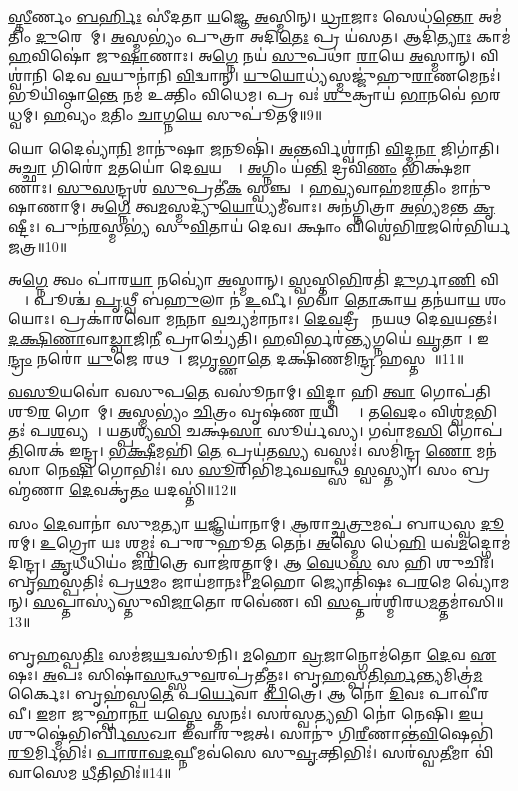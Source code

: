 \ul{𑌸𑍍𑌤𑍀}𑌰𑍍𑌣𑌂 \ul{𑌬}\ul{𑌰𑍍}𑌹𑌿𑌃 𑌸𑍀॑𑌦𑌤𑌾 \ul{𑌯}𑌜𑍍𑌞𑍇 \ul{𑌅}𑌸𑍍𑌮𑌿𑌨𑍍।
\ul{𑌧𑍍𑌰𑌾}𑌜𑌾𑌃 𑌸𑍇𑌧॑\ul{𑌨𑍍𑌤𑍋} 𑌅𑌮॑𑌤𑌿𑌂 \ul{𑌦𑍁}𑌰𑍇𑌵𑌾᳚𑌮𑍍।
\ul{𑌅}𑌸𑍍𑌮𑌭𑍍𑌯𑌂॑ 𑌪𑍁𑌤𑍍𑌰𑌾 𑌅𑌦𑌿\ul{𑌤𑍇𑌃} 𑌪𑍍𑌰 𑌯॑𑌸𑌤।
𑌆𑌦𑌿॑\ul{𑌤𑍍𑌯𑌾𑌃} 𑌕𑌾𑌮॑ \ul{𑌹}𑌵𑌿𑌷𑍋॑ 𑌜𑍁\ul{𑌷𑌾}𑌣𑌾𑌃।
𑌅\ul{𑌗𑍍𑌨𑍇} 𑌨𑌯॑ \ul{𑌸𑍁}𑌪𑌥𑌾॑ \ul{𑌰𑌾}𑌯𑍇 \ul{𑌅}𑌸𑍍𑌮𑌾𑌨𑍍।
𑌵𑌿𑌶𑍍𑌵𑌾॑𑌨𑌿 𑌦𑍇𑌵 \ul{𑌵}𑌯𑍁𑌨𑌾॑𑌨𑌿 \ul{𑌵𑌿}𑌦𑍍𑌵𑌾𑌨𑍍।
\ul{𑌯𑍁}\ul{𑌯𑍋}𑌧𑍍𑌯॑𑌸𑍍𑌮𑌜𑍍𑌜𑍁॑𑌹𑍁\ul{𑌰𑌾}𑌣𑌮𑍇𑌨𑌃॑।
𑌭𑍂𑌯𑌿॑𑌷𑍍𑌠𑌾\ul{𑌨𑍍𑌤𑍇} 𑌨𑌮॑ 𑌉𑌕𑍍𑌤𑌿𑌂 𑌵𑌿𑌧𑍇𑌮।
𑌪𑍍𑌰 𑌵𑌃॑ \ul{𑌶𑍁}𑌕𑍍𑌰𑌾𑌯॑ \ul{𑌭𑌾}𑌨𑌵𑍇॑ 𑌭𑌰𑌧𑍍𑌵𑌮𑍍।
\ul{𑌹}𑌵𑍍𑌯𑌂 \ul{𑌮}𑌤𑌿𑌂 \ul{𑌚𑌾}𑌗𑍍𑌨\ul{𑌯𑍇} 𑌸𑍁𑌪𑍂॑𑌤𑌮𑍍॥9॥

𑌯𑍋 𑌦𑍈𑌵𑍍𑌯𑌾॑\ul{𑌨𑌿} 𑌮𑌾𑌨𑍁॑𑌷𑌾 \ul{𑌜}𑌨𑍂𑌷𑌿॑।
\ul{𑌅}𑌨𑍍𑌤𑌰𑍍𑌵𑌿𑌶𑍍𑌵𑌾॑𑌨𑌿 \ul{𑌵𑌿}𑌦𑍍𑌮\ul{𑌨𑌾} 𑌜𑌿𑌗𑌾॑𑌤𑌿।
𑌅\ul{𑌚𑍍𑌛𑌾} 𑌗𑌿𑌰𑍋॑ \ul{𑌮}𑌤𑌯𑍋॑ 𑌦𑍇\ul{𑌵}𑌯𑌨𑍍𑌤𑍀𑌃᳚।
\ul{𑌅}𑌗𑍍𑌨𑌿𑌂 𑌯॑\ul{𑌨𑍍𑌤𑌿} 𑌦𑍍𑌰𑌵𑌿॑\ul{𑌣𑌂} 𑌭𑌿𑌕𑍍𑌷॑𑌮𑌾𑌣𑌾𑌃।
\ul{𑌸𑍁}\ul{𑌸}𑌨𑍍𑌦𑍃𑌶॑ \ul{𑌸𑍁}𑌪𑍍𑌰𑌤𑍀॑\ul{𑌕}\ul{} 𑌸𑍍𑌵𑌞𑍍𑌚𑌮𑍍᳚।
\ul{𑌹}\ul{𑌵𑍍𑌯}𑌵𑌾𑌹॑𑌮\ul{𑌰}𑌤𑌿𑌂 𑌮𑌾𑌨𑍁॑𑌷𑌾𑌣𑌾𑌮𑍍।
𑌅\ul{𑌗𑍍𑌨𑍇} 𑌤𑍍𑌵\ul{𑌮}𑌸𑍍𑌮𑌦𑍍𑌯𑍁॑\ul{𑌯𑍋}𑌧𑍍𑌯𑌮𑍀॑𑌵𑌾𑌃।
𑌅𑌨॑𑌗𑍍𑌨𑌿𑌤𑍍𑌰𑌾 \ul{𑌅}𑌭𑍍𑌯॑𑌮𑌨𑍍𑌤 \ul{𑌕𑍃}𑌷𑍍𑌟𑍀𑌃।
𑌪𑍁𑌨॑\ul{𑌰}𑌸𑍍𑌮𑌭𑍍𑌯॑ 𑌸𑍁\ul{𑌵𑌿}𑌤𑌾𑌯॑ 𑌦𑍇𑌵।
𑌕𑍍𑌷𑌾𑌂 𑌵𑌿𑌶𑍍𑌵𑍇॑𑌭𑌿\ul{𑌰}𑌜𑌰𑍇॑𑌭𑌿𑌰𑍍𑌯𑌜𑌤𑍍𑌰॥10॥

𑌅\ul{𑌗𑍍𑌨𑍇} 𑌤𑍍𑌵𑌂 𑌪𑌾॑𑌰\ul{𑌯𑌾} 𑌨𑌵𑍍𑌯𑍋॑ \ul{𑌅}𑌸𑍍𑌮𑌾𑌨𑍍।
\ul{𑌸𑍍𑌵}𑌸𑍍𑌤𑌿\ul{𑌭𑌿}𑌰𑌤𑌿॑ \ul{𑌦𑍁}𑌰𑍍𑌗𑌾\ul{𑌣𑌿} 𑌵𑌿𑌶𑍍𑌵𑌾᳚।
𑌪𑍂𑌶𑍍𑌚॑ \ul{𑌪𑍃}𑌥𑍍𑌵𑍀 𑌬॑\ul{𑌹𑍁}𑌲𑌾 𑌨॑ \ul{𑌉}𑌰𑍍𑌵𑍀।
𑌭𑌵𑌾॑ \ul{𑌤𑍋}𑌕𑌾\ul{𑌯} 𑌤𑌨॑𑌯𑌾\ul{𑌯} 𑌶𑌂 𑌯𑍋𑌃।
𑌪𑍍𑌰𑌕𑌾॑𑌰𑌵𑍋 𑌮\ul{𑌨}𑌨𑌾 \ul{𑌵}𑌚𑍍𑌯𑌮𑌾॑𑌨𑌾𑌃।
\ul{𑌦𑍇}\ul{𑌵}𑌦𑍍𑌰𑍀𑌚𑍀𑌂᳚ 𑌨𑌯𑌥 𑌦𑍇\ul{𑌵}𑌯𑌨𑍍𑌤𑌃॑।
\ul{𑌦}\ul{𑌕𑍍𑌷𑌿}\ul{𑌣𑌾}𑌵𑌾\ul{𑌡𑍍𑌵𑌾}𑌜𑌿\ul{𑌨𑍀} 𑌪𑍍𑌰𑌾𑌚𑍍𑌯𑍇॑𑌤𑌿।
\ul{𑌹}𑌵𑌿𑌰𑍍𑌭𑌰॑\ul{𑌨𑍍𑌤𑍍𑌯}𑌗𑍍𑌨𑌯𑍇॑ \ul{𑌘𑍃}𑌤𑌾𑌚𑍀᳚।
𑌇\ul{𑌨𑍍𑌦𑍍𑌰𑌂} 𑌨𑌰𑍋॑ \ul{𑌯𑍁}𑌜𑍇 𑌰𑌥𑌮𑍍᳚।
\ul{𑌜}\ul{𑌗𑍃}𑌭𑍍𑌣𑌾\ul{𑌤𑍇} 𑌦𑌕𑍍𑌷𑌿॑𑌣𑌮𑌿\ul{𑌨𑍍𑌦𑍍𑌰} 𑌹𑌸𑍍𑌤𑌮𑍍᳚॥11॥

\ul{𑌵}\ul{𑌸𑍂}𑌯𑌵𑍋॑ 𑌵𑌸𑍁𑌪\ul{𑌤𑍇} 𑌵𑌸𑍂॑𑌨𑌾𑌮𑍍।
\ul{𑌵𑌿}𑌦𑍍𑌮𑌾 𑌹𑌿 \ul{𑌤𑍍𑌵𑌾} 𑌗𑍋𑌪॑𑌤𑌿 𑌶𑍂\ul{𑌰} 𑌗𑍋𑌨𑌾᳚𑌮𑍍।
\ul{𑌅}𑌸𑍍𑌮𑌭𑍍𑌯𑌂॑ \ul{𑌚𑌿}𑌤𑍍𑌰𑌂 𑌵𑍃𑌷॑𑌣 \ul{𑌰}𑌯𑌿𑌨𑍍𑌦𑌾𑌃᳚।
𑌤\ul{𑌵𑍇}𑌦𑌂 𑌵𑌿𑌶𑍍𑌵॑\ul{𑌮}𑌭𑌿𑌤𑌃॑ 𑌪\ul{𑌶}𑌵𑍍𑌯𑌮𑍍᳚।
𑌯𑌤𑍍𑌪𑌶𑍍𑌯॑\ul{𑌸𑌿} 𑌚𑌕𑍍𑌷॑\ul{𑌸𑌾} 𑌸𑍂𑌰𑍍𑌯॑𑌸𑍍𑌯।
𑌗𑌵𑌾॑𑌮\ul{𑌸𑌿} 𑌗𑍋𑌪॑\ul{𑌤𑌿}𑌰𑍇𑌕॑ 𑌇𑌨𑍍𑌦𑍍𑌰।
\ul{𑌭}\ul{𑌕𑍍𑌷𑍀}𑌮𑌹𑌿॑ \ul{𑌤𑍇} 𑌪𑍍𑌰𑌯॑𑌤\ul{𑌸𑍍𑌯} 𑌵𑌸𑍍𑌵𑌃॑।
𑌸𑌮𑌿॑𑌨𑍍𑌦𑍍𑌰 \ul{𑌣𑍋} 𑌮𑌨॑𑌸𑌾 𑌨𑍇\ul{𑌷𑌿} 𑌗𑍋𑌭𑌿𑌃॑।
𑌸 \ul{𑌸𑍂}𑌰𑌿𑌭𑌿॑𑌰𑍍𑌮𑌘\ul{𑌵}𑌨𑍍𑌥𑍍𑌸 \ul{𑌸𑍍𑌵}𑌸𑍍𑌤𑍍𑌯𑌾।
𑌸𑌂 𑌬𑍍𑌰𑌹𑍍𑌮॑𑌣𑌾 \ul{𑌦𑍇}𑌵𑌕𑍃॑\ul{𑌤𑌂} 𑌯𑌦𑌸𑍍𑌤𑌿॑॥12॥

𑌸𑌂 \ul{𑌦𑍇}𑌵𑌾𑌨𑌾॑ 𑌸𑍁\ul{𑌮}𑌤𑍍𑌯𑌾 \ul{𑌯}𑌜𑍍𑌞𑌿𑌯𑌾॑𑌨𑌾𑌮𑍍।
\ul{𑌆}𑌰𑌾𑌚𑍍𑌛\ul{𑌤𑍍𑌰𑍁}𑌮𑌪॑ 𑌬𑌾𑌧𑌸𑍍𑌵 \ul{𑌦𑍂}𑌰𑌮𑍍।
\ul{𑌉}𑌗𑍍𑌰𑍋 𑌯𑌃 𑌶𑌮𑍍𑌬𑌃॑ 𑌪𑍁𑌰𑍁𑌹𑍂\ul{𑌤} 𑌤𑍇𑌨॑।
\ul{𑌅}𑌸𑍍𑌮𑍇 𑌧𑍇॑\ul{𑌹𑌿} 𑌯𑌵॑\ul{𑌮}𑌦𑍍𑌗𑍋𑌮॑𑌦𑌿𑌨𑍍𑌦𑍍𑌰।
\ul{𑌕𑍃}𑌧𑍀𑌧𑌿𑌯𑌂॑ 𑌜\ul{𑌰𑌿}𑌤𑍍𑌰𑍇 𑌵𑌾𑌜॑𑌰𑌤𑍍𑌨𑌾𑌮𑍍।
𑌆 \ul{𑌵𑍇}𑌧\ul{𑌸}\ul{} 𑌸 𑌹𑌿 𑌶𑍁𑌚𑌿𑌃॑।
𑌬𑍃\ul{𑌹}𑌸𑍍𑌪𑌤𑌿𑌃॑ 𑌪𑍍𑌰\ul{𑌥}𑌮𑌂 𑌜𑌾𑌯॑𑌮𑌾𑌨𑌃।
\ul{𑌮}𑌹𑍋 𑌜𑍍𑌯𑍋𑌤𑌿॑𑌷𑌃 𑌪\ul{𑌰}𑌮𑍇 𑌵𑍍𑌯𑍋॑𑌮𑌨𑍍।
\ul{𑌸}𑌪𑍍𑌤𑌾𑌸𑍍𑌯॑𑌸𑍍𑌤𑍁𑌵𑌿\ul{𑌜𑌾}𑌤𑍋 𑌰𑌵𑍇॑𑌣।
𑌵𑌿 \ul{𑌸}𑌪𑍍𑌤𑌰॑𑌶𑍍𑌮𑌿𑌰𑌧\ul{𑌮}𑌤𑍍𑌤𑌮𑌾॑𑌸𑌿॥13॥

𑌬𑍃\ul{𑌹}𑌸𑍍𑌪\ul{𑌤𑌿𑌃} 𑌸𑌮॑𑌜\ul{𑌯}𑌦𑍍𑌵𑌸𑍂॑𑌨𑌿।
\ul{𑌮}𑌹𑍋 \ul{𑌵𑍍𑌰}𑌜𑌾𑌨𑍍𑌗𑍋𑌮॑𑌤𑍋 \ul{𑌦𑍇}𑌵 \ul{𑌏}𑌷𑌃।
\ul{𑌅}𑌪𑌃 𑌸𑌿𑌷𑌾॑\ul{𑌸}𑌨𑍍𑌥𑍍𑌸𑍁\ul{𑌵}𑌰𑌪𑍍𑌰॑𑌤𑍀𑌤𑍍𑌤𑌃।
𑌬𑍃\ul{𑌹}𑌸𑍍𑌪\ul{𑌤𑌿}\ul{𑌰𑍍}𑌹\ul{𑌨𑍍𑌤𑍍𑌯}𑌮𑌿𑌤𑍍𑌰॑\ul{𑌮}𑌰𑍍𑌕𑍈𑌃।
𑌬𑍃𑌹॑𑌸𑍍𑌪\ul{𑌤𑍇} 𑌪\ul{𑌰𑍍𑌯𑍇}𑌵𑌾 \ul{𑌪𑌿}𑌤𑍍𑌰𑍇।
𑌆 𑌨𑍋॑ \ul{𑌦𑌿}𑌵𑌃 𑌪𑌾𑌵𑍀॑𑌰𑌵𑍀।
\ul{𑌇}𑌮𑌾 𑌜𑍁𑌹𑍍𑌵𑌾॑\ul{𑌨𑌾} 𑌯\ul{𑌸𑍍𑌤𑍇} 𑌸𑍍𑌤𑌨𑌃॑।
𑌸𑌰॑𑌸𑍍𑌵\ul{𑌤𑍍𑌯}𑌭𑌿 𑌨𑍋॑ 𑌨𑍇𑌷𑌿।
\ul{𑌇}𑌯 𑌶𑍁𑌷𑍍𑌮𑍇॑𑌭𑌿𑌰𑍍𑌬𑌿\ul{𑌸}𑌖𑌾 𑌇॑𑌵𑌾𑌰𑍁𑌜𑌤𑍍।
𑌸𑌾𑌨𑍁॑ 𑌗𑌿\ul{𑌰𑍀}𑌣𑌾𑌨𑍍𑌤॑\ul{𑌵𑌿}𑌷𑍇𑌭𑌿॑\ul{𑌰𑍂}𑌰𑍍𑌮𑌿𑌭𑌿𑌃॑।
\ul{𑌪𑌾}\ul{𑌰𑌾}\ul{𑌵}\ul{𑌦}𑌘𑍍𑌨𑍀𑌮𑌵॑𑌸𑍇 𑌸𑍁\ul{𑌵𑍃}𑌕𑍍𑌤𑌿𑌭𑌿𑌃॑।
𑌸𑌰॑𑌸𑍍𑌵\ul{𑌤𑍀}𑌮𑌾 𑌵𑌿॑𑌵𑌾𑌸𑍇𑌮 \ul{𑌧𑍀}𑌤𑌿𑌭𑌿𑌃॑॥14॥\anuvakamend[\ul{𑌦𑍇}\ul{𑌵}𑌯𑌾𑌨𑍈᳚\ul{𑌰𑍍𑌦𑍇}𑌵𑌾𑌃 𑌸𑍁𑌪𑍂॑𑌤𑌂 𑌯𑌜\ul{𑌤𑍍𑌰} 𑌹\ul{𑌸𑍍𑌤}𑌮\ul{𑌸𑍍𑌤𑌿} 𑌤𑌮𑌾\dng{ꣴ}॑\ul{𑌸𑍍𑌯𑍂}𑌰𑍍𑌮𑌿\ul{𑌭𑌿}𑌰𑍍𑌦𑍍𑌵𑍇 𑌚॑]

